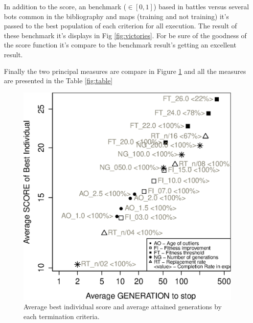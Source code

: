 \documentclass[runningheads,a4paper]{llncs}
\begin{document}
In addition to the score, an benchmark ($\in[0,1]$) based in battles versus several bots common in the bibliography and maps (training and not training) it's passed to the best population of each criterion for all execution. The result of these benchmark it's displays in Fig \ref{fig:victories}. For be sure of the goodness of the score function it's compare to the benchmark result's getting an excellent result.


Finally the two principal measures are compare in Figure \ref{subfig:comparative} and all the measures are presented in the Table \ref{fig:table}

\begin{figure}[h!tb]
\begin{minipage}[b]{.48\columnwidth}
\includegraphics[width=1\columnwidth]{imags/Comparative-log.eps}
\caption{Average best individual score and average attained generations by each termination criteria.}
\label{subfig:comparative}
\vfill
\end{minipage}
\hfill
\begin{minipage}[b]{.40\columnwidth}

\end{minipage}
\end{figure}
\end{document}
